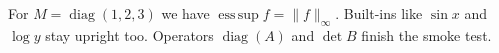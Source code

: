\documentclass{article}
\DeclareMathOperator{\diag}{diag}
\DeclareMathOperator*{\esssup}{ess\,sup}
\begin{document}
For $M=\diag(1,2,3)$ we have $\esssup f = \|f\|_\infty$.
Built-ins like $\sin x$ and $\log y$ stay upright too.
Operators $\diag(A)$ and $\det B$ finish the smoke test.
\end{document}
